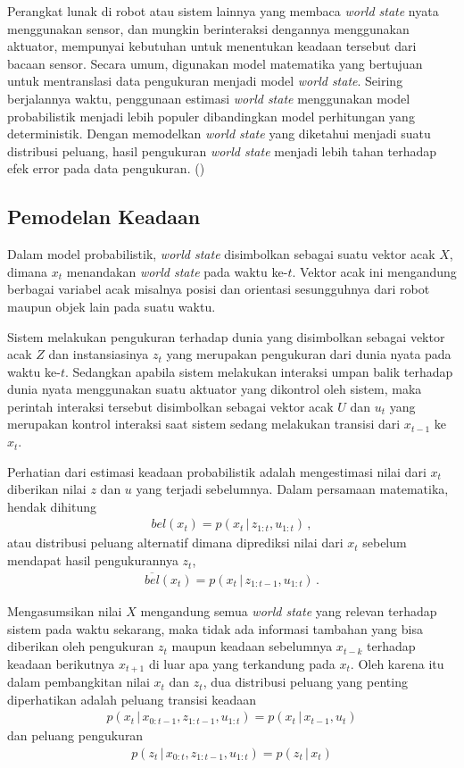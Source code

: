 Perangkat lunak di robot atau sistem lainnya yang membaca \textit{world state} nyata menggunakan sensor, dan mungkin berinteraksi dengannya menggunakan aktuator, mempunyai kebutuhan untuk menentukan keadaan tersebut dari bacaan sensor. Secara umum, digunakan model matematika yang bertujuan untuk mentranslasi data pengukuran menjadi model \textit{world state}. Seiring berjalannya waktu, penggunaan estimasi \textit{world state} menggunakan model probabilistik menjadi lebih populer dibandingkan model perhitungan yang deterministik. Dengan memodelkan \textit{world state} yang diketahui menjadi suatu distribusi peluang, hasil pengukuran \textit{world state} menjadi lebih tahan terhadap efek error pada data pengukuran. (\cite{thrun2010})

\subsection{Pemodelan Keadaan}

Dalam model probabilistik, \textit{world state} disimbolkan sebagai suatu vektor acak $X$, dimana $x_t$ menandakan \textit{world state} pada waktu ke-$t$. Vektor acak ini mengandung berbagai variabel acak misalnya posisi dan orientasi sesungguhnya dari robot maupun objek lain pada suatu waktu.

Sistem melakukan pengukuran terhadap dunia yang disimbolkan sebagai vektor acak $Z$ dan instansiasinya $z_t$ yang merupakan pengukuran dari dunia nyata pada waktu ke-$t$. Sedangkan apabila sistem melakukan interaksi umpan balik terhadap dunia nyata menggunakan suatu aktuator yang dikontrol oleh sistem, maka perintah interaksi tersebut disimbolkan sebagai vektor acak $U$ dan $u_t$ yang merupakan kontrol interaksi saat sistem sedang melakukan transisi dari $x_{t-1}$ ke $x_t$.

Perhatian dari estimasi keadaan probabilistik adalah mengestimasi nilai dari $x_t$ diberikan nilai $z$ dan $u$ yang terjadi sebelumnya. Dalam persamaan matematika, hendak dihitung
\begin{align}
    bel(x_t) = p(x_t \,|\, z_{1:t}, u_{1:t}) \,,
\end{align}
atau distribusi peluang alternatif dimana diprediksi nilai dari $x_t$ sebelum mendapat hasil pengukurannya $z_t$,
\begin{align}
    \overline{bel}(x_t) = p(x_t \,|\, z_{1:t-1}, u_{1:t}) \,.
\end{align}

Mengasumsikan nilai $X$ mengandung semua \textit{world state} yang relevan terhadap sistem pada waktu sekarang, maka tidak ada informasi tambahan yang bisa diberikan oleh pengukuran $z_t$ maupun keadaan sebelumnya $x_{t-k}$ terhadap keadaan berikutnya $x_{t+1}$ di luar apa yang terkandung pada $x_t$. Oleh karena itu dalam pembangkitan nilai $x_t$ dan $z_t$, dua distribusi peluang yang penting diperhatikan adalah peluang transisi keadaan
\begin{align}
    p(x_t \,|\, x_{0:t-1}, z_{1:t-1}, u_{1:t}) = p(x_t \,|\, x_{t-1}, u_t)
\end{align}
dan peluang pengukuran
\begin{align}
    p(z_t \,|\, x_{0:t}, z_{1:t-1}, u_{1:t}) = p(z_t \,|\, x_t)
\end{align}


